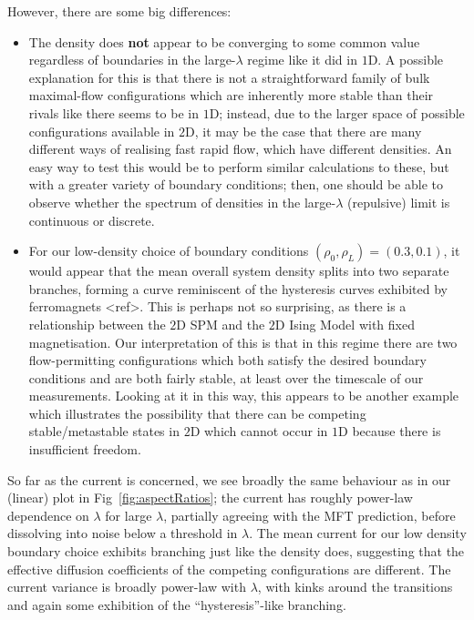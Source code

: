 However, there are some big differences:
\begin{itemize}
 \item The density does \textbf{not} appear to be converging to some common value regardless of
 boundaries in the large-$\lambda$ regime like it did in $1$D. A possible explanation for this
 is that there is not a straightforward family of bulk maximal-flow configurations which are
 inherently more stable than their rivals like there seems to be in $1$D; instead, due to the
 larger space of possible configurations available in $2$D, it may be the case that there are many
 different ways of realising fast rapid flow, which have different densities. An easy way to test
 this would be to perform similar calculations to these, but with a greater variety of boundary
 conditions; then, one should be able to observe whether the spectrum of densities in
 the large-$\lambda$ (repulsive) limit is continuous or discrete.
 \item For our low-density choice of boundary conditions $(\rho_0, \rho_L) = (0.3, 0.1)$,
 it would appear that the mean overall system density splits into two separate branches,
 forming a curve reminiscent of the hysteresis curves exhibited by ferromagnets <ref>. This
 is perhaps not so surprising, as there is a relationship between the $2$D SPM and the $2$D Ising
 Model with fixed magnetisation. Our interpretation of this is that in this regime there are
 two flow-permitting configurations which both satisfy the desired boundary conditions
 and are both fairly stable, at least over the timescale of our measurements. Looking at it in 
 this way, this appears to be another example which illustrates the possibility that there can
 be competing stable/metastable states in $2$D which cannot occur in $1$D because there is
 insufficient freedom.
\end{itemize}
So far as the current is concerned, we see broadly the same behaviour as in our (linear) plot
in Fig~\ref{fig:aspectRatios}; the current has roughly power-law dependence on $\lambda$ for
large $\lambda$, partially agreeing with the MFT prediction, before dissolving into noise
below a threshold in $\lambda$. The mean current for our low density boundary choice exhibits branching just
like
the density does, suggesting that the effective diffusion coefficients of the competing 
configurations are different. The current variance is broadly power-law with $\lambda$,
with kinks around the transitions and again some exhibition of the ``hysteresis''-like branching.


